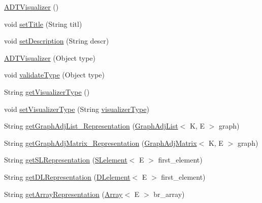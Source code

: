 \begin{DoxyCompactItemize}
\item 
\hyperlink{classbridges_1_1base_1_1_a_d_t_visualizer_a3d5098e4c0609c19a547f19f0d538eeb}{A\+D\+T\+Visualizer} ()
\item 
void \hyperlink{classbridges_1_1base_1_1_a_d_t_visualizer_ab0fda74356fefe16f5b3b98a5fce1f9e}{set\+Title} (String titl)
\item 
void \hyperlink{classbridges_1_1base_1_1_a_d_t_visualizer_ab00d1c82e11326ce68c0146bc393c4b1}{set\+Description} (String descr)
\item 
\hyperlink{classbridges_1_1base_1_1_a_d_t_visualizer_af722d7ea9506b1ca8119ae39c43130ff}{A\+D\+T\+Visualizer} (Object type)
\item 
void \hyperlink{classbridges_1_1base_1_1_a_d_t_visualizer_a991fc08ab102bc0f861e0aefe75282e7}{validate\+Type} (Object type)
\item 
String \hyperlink{classbridges_1_1base_1_1_a_d_t_visualizer_aea37161ff4b74fbeae6f478b4c2e1a50}{get\+Visualizer\+Type} ()
\item 
void \hyperlink{classbridges_1_1base_1_1_a_d_t_visualizer_a5f423ff4295f3ae4371c86d4ab45638c}{set\+Visualizer\+Type} (String \hyperlink{classbridges_1_1base_1_1_a_d_t_visualizer_a288aece657b5641f48e839b34f3884b9}{visualizer\+Type})
\item 
String \hyperlink{classbridges_1_1base_1_1_a_d_t_visualizer_a0b923e3a1afd3d56b5c42ef39e4c5542}{get\+Graph\+Adj\+List\+\_\+\+Representation} (\hyperlink{classbridges_1_1base_1_1_graph_adj_list}{Graph\+Adj\+List}$<$ K, E $>$ graph)
\item 
String \hyperlink{classbridges_1_1base_1_1_a_d_t_visualizer_a7e3ecfc9522596bd12f0adef694eacf2}{get\+Graph\+Adj\+Matrix\+\_\+\+Representation} (\hyperlink{classbridges_1_1base_1_1_graph_adj_matrix}{Graph\+Adj\+Matrix}$<$ K, E $>$ graph)
\item 
String \hyperlink{classbridges_1_1base_1_1_a_d_t_visualizer_a8bfd44ca6eef7b19feb6061cb7e141ef}{get\+S\+L\+Representation} (\hyperlink{classbridges_1_1base_1_1_s_lelement}{S\+Lelement}$<$ E $>$ first\+\_\+element)
\item 
String \hyperlink{classbridges_1_1base_1_1_a_d_t_visualizer_a43eeb9f3321477f58edc3aff52631f3b}{get\+D\+L\+Representation} (\hyperlink{classbridges_1_1base_1_1_d_lelement}{D\+Lelement}$<$ E $>$ first\+\_\+element)
\item 
String \hyperlink{classbridges_1_1base_1_1_a_d_t_visualizer_ab3e96c568b11f9ef683191d1e03d5719}{get\+Array\+Representation} (\hyperlink{classbridges_1_1base_1_1_array}{Array}$<$ E $>$ br\+\_\+array)

\end{DoxyCompactItemize}
